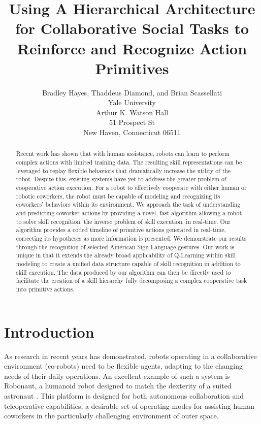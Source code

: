 \documentclass[letterpaper]{article}
\begin{document}
\title{Using A Hierarchical Architecture for Collaborative Social Tasks to Reinforce and Recognize Action Primitives}
\author{Bradley Hayes, Thaddeus Diamond, and Brian Scassellati\\
Yale University\\
Arthur K. Watson Hall\\
51 Prospect St\\
New Haven, Connecticut 06511\\
}

\maketitle

\begin{abstract}
 Recent work has shown that with human
assistance, robots can learn to perform complex actions with limited training data. The
resulting skill representations can be leveraged to replay flexible behaviors
that dramatically increase the utility of the robot. Despite this, existing
systems have yet to address the greater problem of cooperative action execution.
For a robot to effectively cooperate with either human or robotic coworkers,
the robot must be capable of modeling and recognizing its
coworkers' behaviors within its environment. We approach the task of
understanding and predicting coworker actions by providing a novel, fast algorithm
allowing a robot to solve skill recognition, the inverse problem of skill execution,
in real-time. Our algorithm provides a coded timeline of
primitive actions generated in real-time, correcting its hypotheses as more
information is presented. We demonstrate our results through the recognition of selected
American Sign Language gestures. Our work is unique in that it extends the already broad applicability of
Q-Learning within skill modeling
to create a unified data structure capable of skill recognition in addition to skill execution.
The data produced by our algorithm can then be directly used to facilitate the
creation of a skill hierarchy fully decomposing a complex cooperative 
task into primitive actions.
\end{abstract}

\section{Introduction}
\label{sec:intro}
	As research in recent years has demonstrated, robots operating in a collaborative environment (co-robots) need to be flexible agents, adapting to the changing needs of their daily operations. An excellent example of such a system is Robonaut, a humanoid robot designed to match the dexterity of a suited astronaut \cite{Robonaut}. This platform is designed for both autonomous collaboration and teleoperative capabilities, a desirable set of operating modes for assisting human coworkers in the particularly challenging environment of outer space.
	
\end{document}
